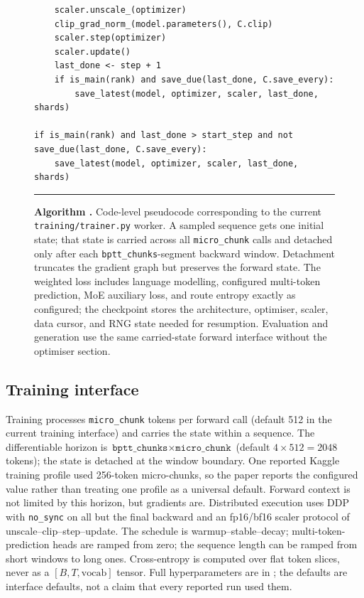 \begin{figure}[!t]
\begin{minipage}{0.96\textwidth}
\begin{verbatim}
    scaler.unscale_(optimizer)
    clip_grad_norm_(model.parameters(), C.clip)
    scaler.step(optimizer)
    scaler.update()
    last_done <- step + 1
    if is_main(rank) and save_due(last_done, C.save_every):
        save_latest(model, optimizer, scaler, last_done, shards)

if is_main(rank) and last_done > start_step and not save_due(last_done, C.save_every):
    save_latest(model, optimizer, scaler, last_done, shards)
\end{verbatim}
\vspace{1mm}\hrule
\end{minipage}
\caption*{\textbf{Algorithm \thealgorithm.} Code-level pseudocode corresponding to the current \texttt{training/trainer.py}
worker. A sampled sequence gets one initial state; that state is carried across all
\texttt{micro\_chunk} calls and detached only after each \texttt{bptt\_chunks}-segment backward
window. Detachment truncates the gradient graph but preserves the forward state. The weighted loss
includes language modelling, configured multi-token prediction, MoE auxiliary loss, and route
entropy exactly as configured; the checkpoint stores the architecture, optimiser, scaler, data
cursor, and RNG state needed for resumption. Evaluation and generation use the same carried-state
forward interface without the optimiser section.}
\label{alg:streaming}
\end{figure}

\subsection{Training interface}

Training processes \texttt{micro\_chunk} tokens per forward call (default 512 in the current
training interface) and carries the state within a sequence. The differentiable horizon is
$\texttt{bptt\_chunks}\times\texttt{micro\_chunk}$ (default $4\times512=2048$ tokens); the
state is detached at the window boundary. One reported Kaggle training profile used
256-token micro-chunks, so the paper reports the configured value rather than treating one
profile as a universal default. Forward context is not limited by this horizon, but gradients
are. Distributed execution uses DDP with \texttt{no\_sync} on all but the final backward and
an fp16/bf16 scaler protocol of unscale--clip--step--update. The schedule is warmup--stable--decay;
multi-token-prediction heads are ramped from zero; the sequence length can be ramped from short
windows to long ones. Cross-entropy is computed over flat token slices, never as a
$[B,T,\text{vocab}]$ tensor. Full hyperparameters are in ; the defaults are
interface defaults, not a claim that every reported run used them.

